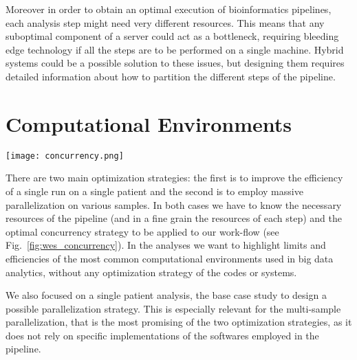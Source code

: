 \documentclass{standalone}
\begin{document}
Moreover in order to obtain an optimal execution of bioinformatics pipelines, each analysis step might need very different resources.
This means that any suboptimal component of a server could act as a bottleneck, requiring bleeding edge technology if all the steps are to be performed on a single machine.
Hybrid systems could be a possible solution to these issues, but designing them requires detailed information about how to partition the different steps of the pipeline.




\section*{Computational Environments}

\begin{figure*}
\centering
\texttt{[image: concurrency.png]}
\caption{Examples of concurrency work-flow of two processes.
The first case ($a$) represents a simple (naive) sequential work-flow; the second ($b$) highlights a brute force parallelization; the third ($c$) is the case of a perfect match between the available resources and the requested resources.
Often brute force parallelization of pipelines done as in the image $b$ ends up overlapping the most computationally intensive steps.
Measuring the minimum viable requirements for the execution allow to better allocate resources as seen in the image $c$.}
\label{fig:wes_concurrency}
\end{figure*}

There are two main optimization strategies: the first is to improve the efficiency of a single run on a single patient and the second is to employ massive parallelization on various samples.
In both cases we have to know the necessary resources of the pipeline (and in a fine grain the resources of each step) and the optimal concurrency strategy to be applied to our work-flow (see Fig.~\ref{fig:wes_concurrency}).
In the analyses we want to highlight limits and efficiencies of the most common computational environments used in big data analytics, without any optimization strategy of the codes or systems.

We also focused on a single patient analysis, the base case study to design a possible parallelization strategy.
This is especially relevant for the multi-sample parallelization, that is the most promising of the two optimization strategies, as it does not rely on specific implementations of the softwares employed in the pipeline.
\end{document}
